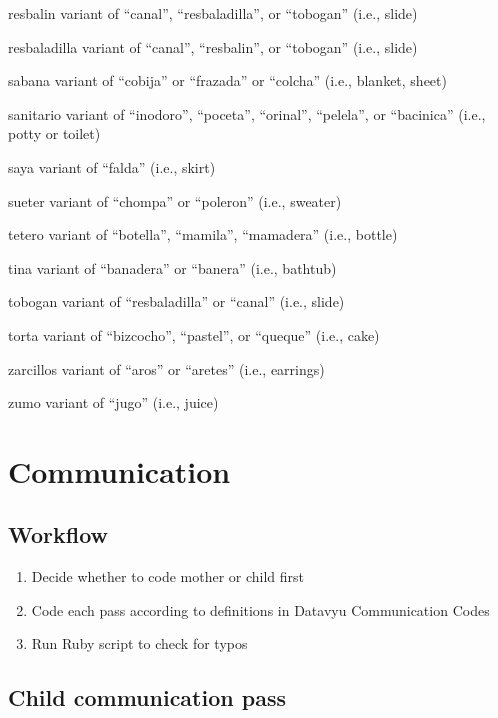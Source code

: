 \documentclass[
]{book}
\providecommand{\tightlist}{%
  \setlength{\itemsep}{0pt}\setlength{\parskip}{0pt}}
\begin{document}
resbalin
variant of ``canal'', ``resbaladilla'', or ``tobogan'' (i.e., slide)

resbaladilla
variant of ``canal'', ``resbalin'', or ``tobogan'' (i.e., slide)

sabana
variant of ``cobija'' or ``frazada'' or ``colcha'' (i.e., blanket, sheet)

sanitario
variant of ``inodoro'', ``poceta'', ``orinal'', ``pelela'', or ``bacinica'' (i.e., potty or toilet)

saya
variant of ``falda'' (i.e., skirt)

sueter
variant of ``chompa'' or ``poleron'' (i.e., sweater)

tetero
variant of ``botella'', ``mamila'', ``mamadera'' (i.e., bottle)

tina
variant of ``banadera'' or ``banera'' (i.e., bathtub)

tobogan
variant of ``resbaladilla'' or ``canal'' (i.e., slide)

torta
variant of ``bizcocho'', ``pastel'', or ``queque'' (i.e., cake)

zarcillos
variant of ``aros'' or ``aretes'' (i.e., earrings)

zumo
variant of ``jugo'' (i.e., juice)

\hypertarget{communication}{%
\chapter{Communication}\label{communication}}

\hypertarget{workflow}{%
\section{Workflow}\label{workflow}}

\begin{enumerate}
\def\labelenumi{\arabic{enumi}.}
\tightlist
\item
  Decide whether to code mother or child first
\item
  Code each pass according to definitions in Datavyu Communication Codes
\item
  Run Ruby script to check for typos
\end{enumerate}

\hypertarget{child-communication-pass}{%
\section{Child communication pass}\label{child-communication-pass}}
\end{document}
